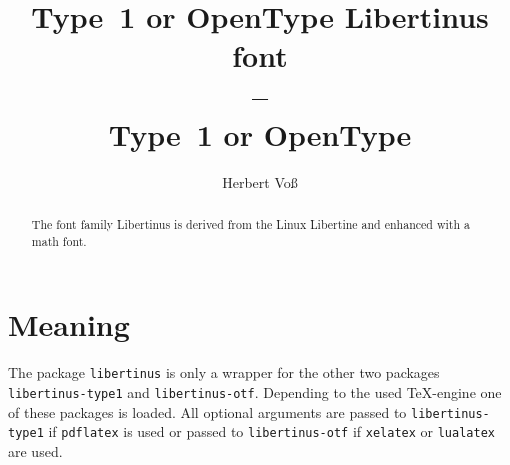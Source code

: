 \documentclass[english]{article}
\title{Type~1 or OpenType Libertinus font\\ --\\ Type~1 or OpenType}
\author{Herbert Voß}
\begin{document}
\maketitle


\begin{abstract}
The font family Libertinus is derived from the Linux Libertine and enhanced with a
math font.
\end{abstract}


\section{Meaning}

The package \texttt{libertinus} is only a wrapper for the other two
packages \texttt{libertinus-type1} and \texttt{libertinus-otf}. Depending
to the used \TeX-engine one of these packages is loaded. All optional
arguments are passed to \texttt{libertinus-type1} if \texttt{pdflatex} is used
or passed to \texttt{libertinus-otf} if \texttt{xelatex} or \texttt{lualatex}
are used.
\end{document}
